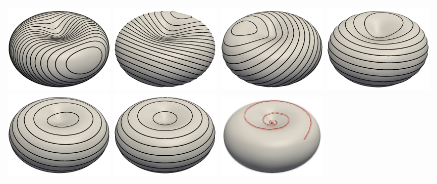 \documentclass{xdms}
\begin{document}
\begin{figure}[h]
	\centering
  \begin{minipage}{\textwidth}
		\includegraphics[width=0.24\textwidth]{pic/rbc/re_10/solution_0000.png}
		\includegraphics[width=0.24\textwidth]{pic/rbc/re_10/solution_0007.png}
		\includegraphics[width=0.24\textwidth]{pic/rbc/re_10/solution_0014.png}
		\includegraphics[width=0.24\textwidth]{pic/rbc/re_10/solution_0028.png}\\
		\includegraphics[width=0.24\textwidth]{pic/rbc/re_10/solution_0042.png}
		\includegraphics[width=0.24\textwidth]{pic/rbc/re_10/solution_0200.png}
		\includegraphics[width=0.24\textwidth]{pic/rbc/vortexTrack_re_10.png}

\end{minipage}
\end{figure}
\end{document}
